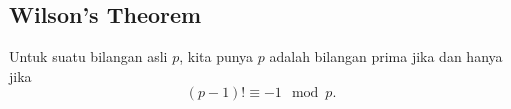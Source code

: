\subsection{Wilson's Theorem}
Untuk suatu bilangan asli $p$, kita punya $p$ adalah bilangan prima jika dan hanya jika
$$(p-1)! \equiv -1 \mod p.$$

